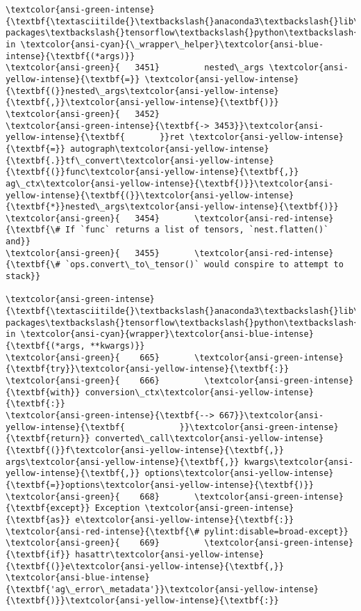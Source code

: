 \documentclass[11pt]{article}
\begin{document}
\begin{Verbatim}[commandchars=\\\{\}, frame=single, framerule=2mm, rulecolor=\color{outerrorbackground}]
\textcolor{ansi-green-intense}{\textbf{\textasciitilde{}\textbackslash{}anaconda3\textbackslash{}lib\textbackslash{}site-packages\textbackslash{}tensorflow\textbackslash{}python\textbackslash{}data\textbackslash{}ops\textbackslash{}dataset\_ops.py}} in \textcolor{ansi-cyan}{\_wrapper\_helper}\textcolor{ansi-blue-intense}{\textbf{(*args)}}
\textcolor{ansi-green}{   3451}         nested\_args \textcolor{ansi-yellow-intense}{\textbf{=}} \textcolor{ansi-yellow-intense}{\textbf{(}}nested\_args\textcolor{ansi-yellow-intense}{\textbf{,}}\textcolor{ansi-yellow-intense}{\textbf{)}}
\textcolor{ansi-green}{   3452} 
\textcolor{ansi-green-intense}{\textbf{-> 3453}}\textcolor{ansi-yellow-intense}{\textbf{       }}ret \textcolor{ansi-yellow-intense}{\textbf{=}} autograph\textcolor{ansi-yellow-intense}{\textbf{.}}tf\_convert\textcolor{ansi-yellow-intense}{\textbf{(}}func\textcolor{ansi-yellow-intense}{\textbf{,}} ag\_ctx\textcolor{ansi-yellow-intense}{\textbf{)}}\textcolor{ansi-yellow-intense}{\textbf{(}}\textcolor{ansi-yellow-intense}{\textbf{*}}nested\_args\textcolor{ansi-yellow-intense}{\textbf{)}}
\textcolor{ansi-green}{   3454}       \textcolor{ansi-red-intense}{\textbf{\# If `func` returns a list of tensors, `nest.flatten()` and}}
\textcolor{ansi-green}{   3455}       \textcolor{ansi-red-intense}{\textbf{\# `ops.convert\_to\_tensor()` would conspire to attempt to stack}}

\textcolor{ansi-green-intense}{\textbf{\textasciitilde{}\textbackslash{}anaconda3\textbackslash{}lib\textbackslash{}site-packages\textbackslash{}tensorflow\textbackslash{}python\textbackslash{}autograph\textbackslash{}impl\textbackslash{}api.py}} in \textcolor{ansi-cyan}{wrapper}\textcolor{ansi-blue-intense}{\textbf{(*args, **kwargs)}}
\textcolor{ansi-green}{    665}       \textcolor{ansi-green-intense}{\textbf{try}}\textcolor{ansi-yellow-intense}{\textbf{:}}
\textcolor{ansi-green}{    666}         \textcolor{ansi-green-intense}{\textbf{with}} conversion\_ctx\textcolor{ansi-yellow-intense}{\textbf{:}}
\textcolor{ansi-green-intense}{\textbf{--> 667}}\textcolor{ansi-yellow-intense}{\textbf{           }}\textcolor{ansi-green-intense}{\textbf{return}} converted\_call\textcolor{ansi-yellow-intense}{\textbf{(}}f\textcolor{ansi-yellow-intense}{\textbf{,}} args\textcolor{ansi-yellow-intense}{\textbf{,}} kwargs\textcolor{ansi-yellow-intense}{\textbf{,}} options\textcolor{ansi-yellow-intense}{\textbf{=}}options\textcolor{ansi-yellow-intense}{\textbf{)}}
\textcolor{ansi-green}{    668}       \textcolor{ansi-green-intense}{\textbf{except}} Exception \textcolor{ansi-green-intense}{\textbf{as}} e\textcolor{ansi-yellow-intense}{\textbf{:}}  \textcolor{ansi-red-intense}{\textbf{\# pylint:disable=broad-except}}
\textcolor{ansi-green}{    669}         \textcolor{ansi-green-intense}{\textbf{if}} hasattr\textcolor{ansi-yellow-intense}{\textbf{(}}e\textcolor{ansi-yellow-intense}{\textbf{,}} \textcolor{ansi-blue-intense}{\textbf{'ag\_error\_metadata'}}\textcolor{ansi-yellow-intense}{\textbf{)}}\textcolor{ansi-yellow-intense}{\textbf{:}}


\end{Verbatim}
\end{document}
